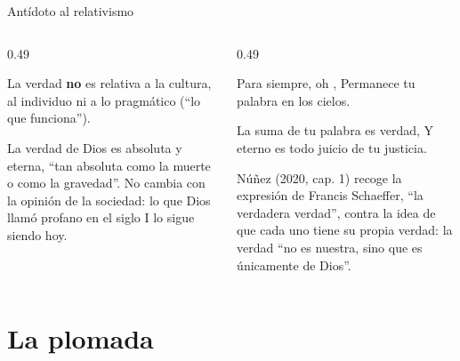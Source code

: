 \begin{frame}{Antídoto al relativismo}
\begin{columns}[t,onlytextwidth]
\begin{column}{0.49\textwidth}
\begin{tcolorbox}[colback=gris!12,colframe=gris,boxrule=0.8pt,arc=3pt,fonttitle=\bfseries\small,title=Rechazo]
\small La verdad \textbf{no} es relativa a la cultura, al individuo ni a lo pragmático (``lo que funciona'').
\end{tcolorbox}
\begin{tcolorbox}[colback=papiro,colframe=azul,boxrule=1pt,arc=3pt,fonttitle=\bfseries\small,title=Afirmación]
\small La verdad de Dios es absoluta y eterna, ``tan absoluta como la muerte o como la gravedad''. No cambia con la opinión de la sociedad: lo que Dios llamó profano en el siglo I lo sigue siendo hoy.
\end{tcolorbox}
\end{column}
\begin{column}{0.49\textwidth}
\begin{cita}Para siempre, oh \SENOR{}, Permanece tu palabra en los cielos.\end{cita}
\begin{cita}La suma de tu palabra es verdad, Y eterno es todo juicio de tu justicia.\end{cita}
\scriptsize Núñez (2020, cap. 1) recoge la expresión de Francis Schaeffer, ``la verdadera verdad'', contra la idea de que cada uno tiene su propia verdad: la verdad ``no es nuestra, sino que es únicamente de Dios''.
\end{column}
\end{columns}
\end{frame}

\section{La plomada}

